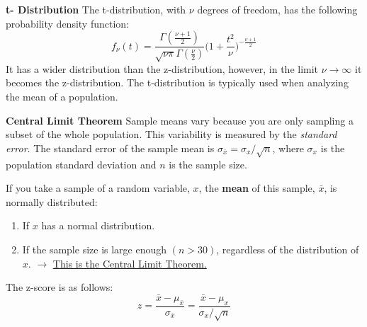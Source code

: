 \vspace{+3.5mm}
\textbf{t- Distribution}
\newline
The t-distribution, with $\nu$ degrees of freedom, has the following probability density function:
% 
\begin{equation}
f_{\nu}(t) = \frac{\Gamma(\frac{\nu + 1}{2})}{\sqrt{\nu \pi} \Gamma(\frac{\nu}{2})} \Big(1 + \frac{t^2}{\nu}\Big)^{-\frac{\nu+1}{2}}
\end{equation}
% 
It has a wider distribution than the z-distribution,
however, in the limit $\nu \rightarrow \infty$ it becomes the z-distribution.
The t-distribution is typically used when analyzing the mean of a population.
\newline
\newline

\vspace{+3.5mm}
\textbf{Central Limit Theorem}
\newline
Sample means vary because you are only sampling a subset of the whole population.\newline
This variability is measured by the \textit{standard error}.
The standard error of the sample mean is
$\sigma_{\bar{x}} = \sigma_{x} / \sqrt{n}$,
where $\sigma_{x}$ is the population standard deviation and $n$ is the sample size.

If you take a sample of a random variable, $x$,
the \textbf{mean} of this sample, $\bar{x}$, is normally distributed:
\vspace{-10mm}
\begin{enumerate}
\item
If $x$ has a normal distribution.
\item
\vspace{-3mm}
If the sample size is large enough $(n > 30)$,
regardless of the distribution of $x$.\newline
$\rightarrow$ \underline{This is the Central Limit Theorem.}
\end{enumerate}
%
\vspace{-3.5mm}
The z-score is as follows:
\begin{equation}
z = \frac{\bar{x}-\mu_{\bar{x}}}{\sigma_{\bar{x}}} = \frac{\bar{x}-\mu_x}{\sigma_x / \sqrt{n}} 
\end{equation}
\newline
\newline

